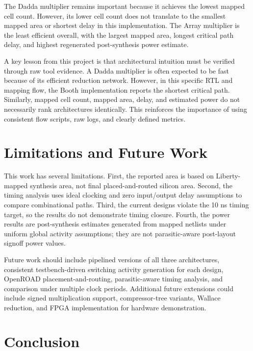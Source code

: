 \documentclass[conference]{IEEEtran}
\begin{document}
The Dadda multiplier remains important because it achieves the lowest mapped cell count. However, its lower cell count does not translate to the smallest mapped area or shortest delay in this implementation. The Array multiplier is the least efficient overall, with the largest mapped area, longest critical path delay, and highest regenerated post-synthesis power estimate.

A key lesson from this project is that architectural intuition must be verified through raw tool evidence. A Dadda multiplier is often expected to be fast because of its efficient reduction network. However, in this specific RTL and mapping flow, the Booth implementation reports the shortest critical path. Similarly, mapped cell count, mapped area, delay, and estimated power do not necessarily rank architectures identically. This reinforces the importance of using consistent flow scripts, raw logs, and clearly defined metrics.

\section{Limitations and Future Work}

This work has several limitations. First, the reported area is based on Liberty-mapped synthesis area, not final placed-and-routed silicon area. Second, the timing analysis uses ideal clocking and zero input/output delay assumptions to compare combinational paths. Third, the current designs violate the 10 ns timing target, so the results do not demonstrate timing closure. Fourth, the power results are post-synthesis estimates generated from mapped netlists under uniform global activity assumptions; they are not parasitic-aware post-layout signoff power values.

Future work should include pipelined versions of all three architectures, consistent testbench-driven switching activity generation for each design, OpenROAD placement-and-routing, parasitic-aware timing analysis, and comparison under multiple clock periods. Additional future extensions could include signed multiplication support, compressor-tree variants, Wallace reduction, and FPGA implementation for hardware demonstration.

\section{Conclusion}
\end{document}
